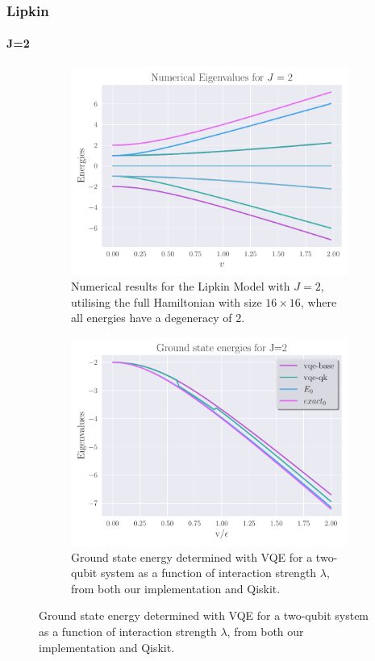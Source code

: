 \documentclass{beamer}
\begin{document}
\begin{frame}[t]
	\frametitle{Lipkin}
	\framesubtitle{J=2}
	\begin{figure}[ht]
		\centering
		\begin{subfigure}[b]{0.45\textwidth}
		\begin{center}
			\includegraphics[width=\textwidth]{../src/plots/lipkin-eigs-4.pdf}
		\end{center}
		\caption{Numerical results for the Lipkin Model with $J = 2$, utilising the full Hamiltonian with size $16 \times 16$, where all energies have a degeneracy of $2$.}
		\label{fig:eig-lipkin-2}
		\end{subfigure}
		\hfill
		\begin{subfigure}[b]{0.45\textwidth}
		\begin{center}
			\includegraphics[width=\textwidth]{../src/plots/lipkin-4.pdf}	
		\end{center}
		\caption{Ground state energy determined with VQE for a two-qubit system as a function of interaction strength $\lambda$, from both our implementation and Qiskit.}
		\label{fig:2-qb-all}
		\end{subfigure}
		\label{fig:2-qb}
	\end{figure}
\end{frame}
\end{document}
